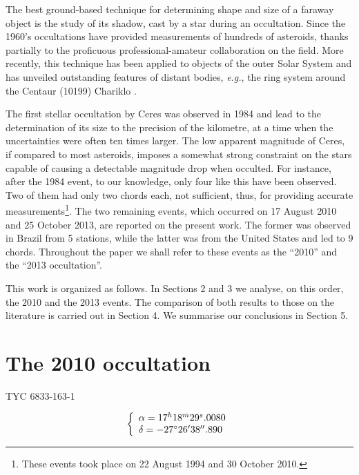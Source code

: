 \documentclass[useAMS,usenatbib]{mn2e}
\begin{document}
The best ground-based technique for determining shape and size of a faraway object is the study of its shadow, cast by a star during an occultation. Since the 1960's occultations have provided measurements of hundreds of asteroids, thanks partially to the proficuous professional-amateur collaboration on the field. More recently, this technique has been applied to objects of the outer Solar System and has unveiled outstanding features of distant bodies, \textit{e.g.}, the ring system around the Centaur (10199) Chariklo \citep{BragaRibas2014}.

The first stellar occultation by Ceres was observed in 1984 \citep{Millis1987} and lead to the determination of its size to the precision of the kilometre, at a time when the uncertainties were often ten times larger. The low apparent magnitude of Ceres, if compared to most asteroids, imposes a somewhat strong constraint on the stars capable of causing a detectable magnitude drop when occulted. For instance, after the 1984 event, to our knowledge, only four like this have been observed. Two of them had only two chords each, not sufficient, thus, for providing accurate measurements\footnote{These events took place on 22 August 1994 and 30 October 2010.}. The two remaining events, which occurred on 17 August 2010 and 25 October 2013, are reported on the present work. The former was observed in Brazil from 5 stations, while the latter was from the United States and led to 9 chords. Throughout the paper we shall refer to these events as the ``2010'' and the ``2013 occultation''.

This work is organized as follows. In Sections 2 and 3 we analyse, on this order, the 2010 and the 2013 events. The comparison of both results to those on the literature is carried out in Section 4. We summarise our conclusions in Section 5.








\section[]{The 2010 occultation}

TYC 6833-163-1

\begin{equation}
\left\{ 
  \begin{array}{l l}
    \alpha = 17^{h}18^{m}29^{s}.0080\\
    \delta = -27\hbox{$^\circ$} 26\hbox{$^\prime$} 38\hbox{$^{\prime\prime}$}.890
  \end{array}
\right.
\end{equation}
\end{document}
